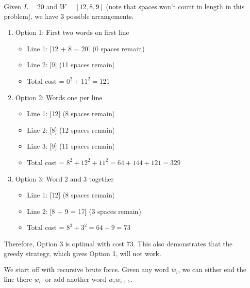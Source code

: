   \begin{example}
    Given $L = 20$ and $W = [12, 8, 9]$ (note that spaces won't count in length in this problem), we have 3 possible arrangements. 
    \begin{enumerate}
      \item Option 1: First two words on first line
      \begin{itemize}
        \item Line 1: [12 + 8 = 20] (0 spaces remain)
        \item Line 2: [9] (11 spaces remain)
        \item Total cost = $0^2 + 11^2 = 121$
      \end{itemize}

      \item Option 2: Words one per line
      \begin{itemize}
        \item Line 1: [12] (8 spaces remain)
        \item Line 2: [8] (12 spaces remain)
        \item Line 3: [9] (11 spaces remain)
        \item Total cost = $8^2 + 12^2 + 11^2 = 64 + 144 + 121 = 329$
      \end{itemize}

      \item Option 3: Word 2 and 3 together
      \begin{itemize}
        \item Line 1: [12] (8 spaces remain)
        \item Line 2: [8 + 9 = 17] (3 spaces remain)
        \item Total cost = $8^2 + 3^2 = 64 + 9 = 73$
      \end{itemize}
    \end{enumerate}
    Therefore, Option 3 is optimal with cost 73. This also demonstrates that the greedy strategy, which gives Option 1, will not work. 
  \end{example}

  We start off with recursive brute force. Given any word $w_i$, we can either end the line there $w_i |$ or add another word $w_i w_{i+1}$. 

